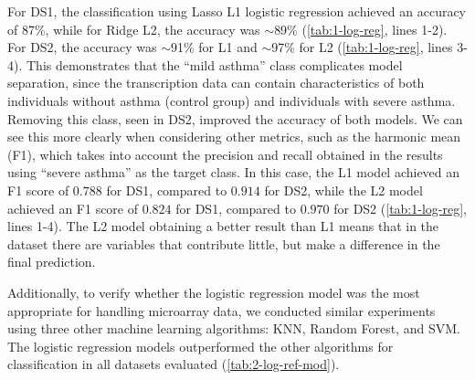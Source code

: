 For DS1, the classification using Lasso L1 logistic regression achieved an accuracy of 87\%, while for Ridge L2, the accuracy was $\sim$89\% (\autoref{tab:1-log-reg}, lines 1-2). For DS2, the accuracy was $\sim$91\% for L1 and $\sim$97\% for L2 (\autoref{tab:1-log-reg}, lines 3-4). This demonstrates that the ``mild asthma'' class complicates model separation, since the transcription data can contain characteristics of both individuals without asthma (control group) and individuals with severe asthma. Removing this class, seen in DS2, improved the accuracy of both models. We can see this more clearly when considering other metrics, such as the harmonic mean (F1), which takes into account the precision and recall obtained in the results using ``severe asthma'' as the target class. In this case, the L1 model achieved an F1 score of $0.788$ for DS1, compared to $0.914$ for DS2, while the L2 model achieved an F1 score of $0.824$ for DS1, compared to $0.970$ for DS2 (\autoref{tab:1-log-reg}, lines 1-4). The L2 model obtaining a better result than L1 means that in the dataset there are variables that contribute little, but make a difference in the final prediction.

Additionally, to verify whether the logistic regression model was the most appropriate for handling microarray data, we conducted similar experiments using three other machine learning algorithms: KNN, Random Forest, and SVM. The logistic regression models outperformed the other algorithms for classification in all datasets evaluated (\autoref{tab:2-log-ref-mod}).

